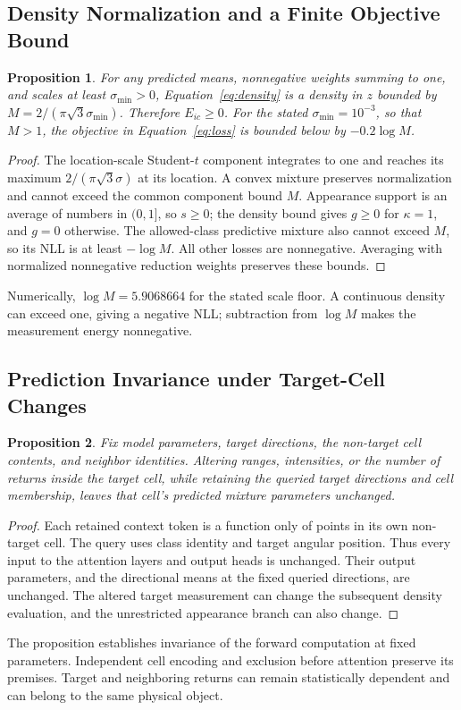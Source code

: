 \documentclass{article}
\newtheorem{proposition}{Proposition}
\begin{document}
\subsection{Density Normalization and a Finite Objective Bound}
\begin{proposition}
For any predicted means, nonnegative weights summing to one, and scales at least $\sigma_{\min}>0$, Equation~\eqref{eq:density} is a density in $z$ bounded by $M=2/(\pi\sqrt3\sigma_{\min})$. Therefore $E_{ic}\geq0$. For the stated $\sigma_{\min}=10^{-3}$, so that $M>1$, the objective in Equation~\eqref{eq:loss} is bounded below by $-0.2\log M$.
\end{proposition}
\begin{proof}
The location-scale Student-$t$ component integrates to one and reaches its maximum $2/(\pi\sqrt3\sigma)$ at its location. A convex mixture preserves normalization and cannot exceed the common component bound $M$. Appearance support is an average of numbers in $(0,1]$, so $s\geq0$; the density bound gives $g\geq0$ for $\kappa=1$, and $g=0$ otherwise. The allowed-class predictive mixture also cannot exceed $M$, so its NLL is at least $-\log M$. All other losses are nonnegative. Averaging with normalized nonnegative reduction weights preserves these bounds.
\end{proof}
Numerically, $\log M=5.9068664$ for the stated scale floor. A continuous density can exceed one, giving a negative NLL; subtraction from $\log M$ makes the measurement energy nonnegative.

\subsection{Prediction Invariance under Target-Cell Changes}
\begin{proposition}
Fix model parameters, target directions, the non-target cell contents, and neighbor identities. Altering ranges, intensities, or the number of returns inside the target cell, while retaining the queried target directions and cell membership, leaves that cell's predicted mixture parameters unchanged.
\end{proposition}
\begin{proof}
Each retained context token is a function only of points in its own non-target cell. The query uses class identity and target angular position. Thus every input to the attention layers and output heads is unchanged. Their output parameters, and the directional means at the fixed queried directions, are unchanged. The altered target measurement can change the subsequent density evaluation, and the unrestricted appearance branch can also change.
\end{proof}
The proposition establishes invariance of the forward computation at fixed parameters. Independent cell encoding and exclusion before attention preserve its premises. Target and neighboring returns can remain statistically dependent and can belong to the same physical object.
\end{document}
